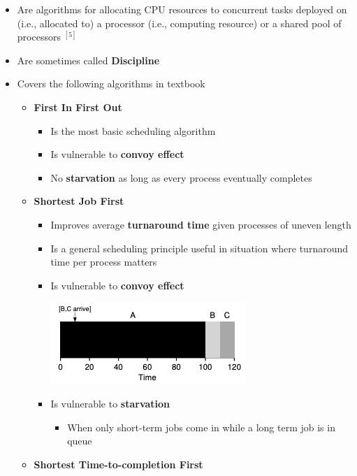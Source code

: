 \documentclass[12pt]{article}
\begin{document}
\begin{itemize}
    \item Are algorithms for allocating CPU resources to concurrent tasks
    deployed on (i.e., allocated to) a processor (i.e., computing resource)
    or a shared pool of processors $^{[5]}$
    \item Are sometimes called \textbf{Discipline}
    \item Covers the following algorithms in textbook

    \begin{itemize}
        \item \textbf{First In First Out}

        \begin{itemize}
            \item Is the most basic scheduling algorithm
            \item Is vulnerable to \textbf{convoy effect}
            \item No \textbf{starvation} as long as every process eventually completes
        \end{itemize}

        \item \textbf{Shortest Job First}

        \begin{itemize}
            \item Improves average \textbf{turnaround time} given processes of uneven length
            \item Is a general scheduling principle useful in situation where turnaround time
            per process matters
            \item Is vulnerable to \textbf{convoy effect}

            \begin{center}
            \includegraphics[width=0.7\linewidth]{../images/midterm_2_solution_6.png}
            \end{center}

            \item Is vulnerable to \textbf{starvation}
            \begin{itemize}
                \item When only short-term jobs come in while a long term job is in queue
            \end{itemize}
        \end{itemize}
        \item \textbf{Shortest Time-to-completion First}


\end{itemize}
\end{itemize}
\end{document}
